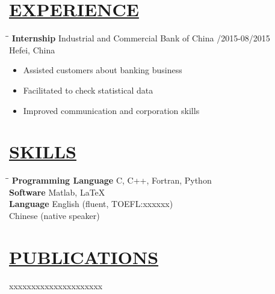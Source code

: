\documentclass{res} %
\begin{document}
\begin{resume}
\section{\underline{EXPERIENCE}}
   \vspace{-0.02in}	
   \begin{tabbing}
   \hspace{2.2in}\= \hspace{2.8in}\= \kill %
    {\bf Internship} \>Industrial and Commercial Bank of China   /2015-08/2015\\
                             \>Hefei, China                          \\
   \end{tabbing}\vspace{-22pt}      %
   \vspace{+0.04in}
\begin{itemize}
  \item Assisted customers about banking business
  \item Facilitated to check statistical data
  \item Improved communication and corporation skills
\end{itemize}


\section{\underline{SKILLS}}
   \vspace{-0.02in}	
    \begin{tabbing}
   \hspace{2.2in}\= \hspace{2.8in}\= \kill %
    {\bf Programming Language} \>C, C++, Fortran, Python   \\
    {\bf Software}   \>Matlab, LaTeX\\
    {\bf Language}   \> English (fluent, TOEFL:xxxxxx)\\
                     \> Chinese (native speaker)    \\
   \end{tabbing}\vspace{-22pt}      %
 \vspace{-0.1in}

\section{\underline{PUBLICATIONS}}
   \vspace{-0.02in}	
   \begin{tabbing}
    xxxxxxxxxxxxxxxxxxxxx \\
    	

\end{tabbing}
\end{resume}
\end{document}
